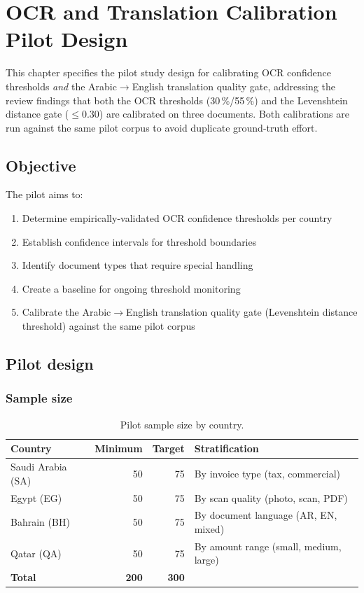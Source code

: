 \documentclass[11pt,a4paper,twoside]{report}
\begin{document}
\chapter{OCR and Translation Calibration Pilot Design}\label{ch:ocr-pilot}

This chapter specifies the pilot study design for calibrating OCR confidence
thresholds \emph{and} the Arabic$\to$English translation quality gate,
addressing the review findings that both the OCR thresholds (30\,\%/55\,\%)
and the Levenshtein distance gate ($\le$0.30) are calibrated on three
documents. Both calibrations are run against the same pilot corpus to avoid
duplicate ground-truth effort.

\section{Objective}

The pilot aims to:
\begin{enumerate}
\item Determine empirically-validated OCR confidence thresholds per country
\item Establish confidence intervals for threshold boundaries
\item Identify document types that require special handling
\item Create a baseline for ongoing threshold monitoring
\item Calibrate the Arabic$\to$English translation quality gate
(Levenshtein distance threshold) against the same pilot corpus
\end{enumerate}

\section{Pilot design}

\subsection{Sample size}

\begin{table}[htbp]
\centering
\caption{Pilot sample size by country.}
\label{tab:pilot-sample}
\footnotesize
\begin{tabularx}{\linewidth}{@{}l r r X@{}}
\toprule
\textbf{Country} & \textbf{Minimum} & \textbf{Target} & \textbf{Stratification} \\ \midrule
Saudi Arabia (SA) & 50 & 75 & By invoice type (tax, commercial) \\
Egypt (EG) & 50 & 75 & By scan quality (photo, scan, PDF) \\
Bahrain (BH) & 50 & 75 & By document language (AR, EN, mixed) \\
Qatar (QA) & 50 & 75 & By amount range (small, medium, large) \\
\textbf{Total} & \textbf{200} & \textbf{300} & \\
\bottomrule
\end{tabularx}
\end{table}
\end{document}
